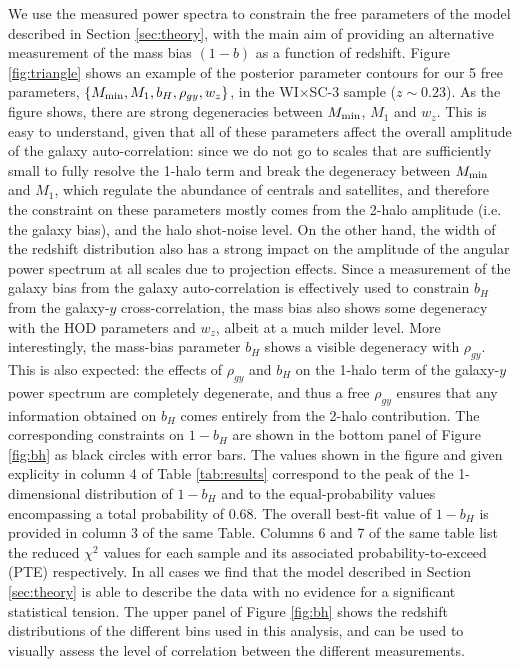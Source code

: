 \documentclass[useAMS,usenatbib]{mn2e}
\newcommand{\wisc}{WI$\times$SC}
\begin{document}
      We use the measured power spectra to constrain the free parameters of the model described in Section \ref{sec:theory}, with the main aim of providing an alternative measurement of the mass bias $(1-b)$ as a function of redshift. Figure \ref{fig:triangle} shows an example of the posterior parameter contours for our 5 free parameters, $\{M_{\rm min},M_1,b_H,\rho_{gy},w_z\}$, in the \wisc-3 sample ($z\sim0.23$). As the figure shows, there are strong degeneracies between $M_{\rm min}$, $M_1$ and $w_z$. This is easy to understand, given that all of these parameters affect the overall amplitude of the galaxy auto-correlation: since we do not go to scales that are sufficiently small to fully resolve the 1-halo term and break the degeneracy between $M_{\rm min}$ and $M_1$, which regulate the abundance of centrals and satellites, and therefore the constraint on these parameters mostly comes from the 2-halo amplitude (i.e. the galaxy bias), and the halo shot-noise level. On the other hand, the width of the redshift distribution also has a strong impact on the amplitude of the angular power spectrum at all scales due to projection effects. Since a measurement of the galaxy bias from the galaxy auto-correlation is effectively used to constrain $b_H$ from the galaxy-$y$ cross-correlation, the mass bias also shows some degeneracy with the HOD parameters and $w_z$, albeit at a much milder level. More interestingly, the mass-bias parameter $b_H$ shows a visible degeneracy with $\rho_{gy}$. This is also expected: the effects of $\rho_{gy}$ and $b_H$ on the 1-halo term of the galaxy-$y$ power spectrum are completely degenerate, and thus a free $\rho_{gy}$ ensures that any information obtained on $b_H$ comes entirely from the 2-halo contribution. The corresponding constraints on $1-b_H$ are shown in the bottom panel of Figure \ref{fig:bh} as black circles with error bars. The values shown in the figure and given explicity in column 4 of Table \ref{tab:results} correspond to the peak of the 1-dimensional distribution of $1-b_H$ and to the equal-probability values encompassing a total probability of 0.68. The overall best-fit value of $1-b_H$ is provided in column 3 of the same Table. Columns 6 and 7 of the same table list the reduced $\chi^2$ values for each sample and its associated probability-to-exceed (PTE) respectively. In all cases we find that the model described in Section \ref{sec:theory} is able to describe the data with no evidence for a significant statistical tension. The upper panel of Figure \ref{fig:bh} shows the redshift distributions of the different bins used in this analysis, and can be used to visually assess the level of correlation between the different measurements.
      
\end{document}
